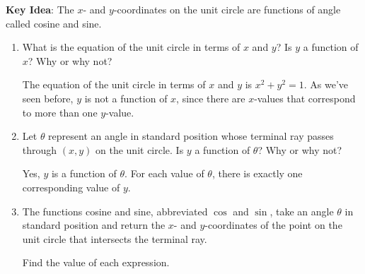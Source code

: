 \documentclass[main]{subfiles}
\begin{document}
\pspace{\newpage}

\textbf{Key Idea}: The $x$- and $y$-coordinates on the unit circle are functions of angle called cosine and sine.

\begin{enumerate}[resume]
    \item 
    \begin{problem}
    What is the equation of the unit circle in terms of $x$ and $y$? Is $y$ a function of $x$? Why or why not?
    \end{problem}
    \pspace{\vfill}

    \begin{solution}
        The equation of the unit circle in terms of $x$ and $y$ is $x^2+y^2=1$. As we've seen before, $y$ is not a function of $x$, since there are $x$-values that correspond to more than one $y$-value.
    \end{solution}

    \item
    \begin{problem}
    Let $\theta$ represent an angle in standard position whose terminal ray passes through $(x,y)$ on the unit circle. Is $y$ a function of $\theta$? Why or why not?
    \end{problem}
    \pspace{\vfill}

    \begin{solution}
        Yes, $y$ is a function of $\theta$. For each value of $\theta$, there is exactly one corresponding value of $y$.
    \end{solution}

\item The functions cosine and sine, abbreviated $\cos$ and $\sin$, take an angle $\theta$ in standard position and return the $x$- and $y$-coordinates of the point on the unit circle that intersects the terminal ray.

Find the value of each expression.


\end{enumerate}
\end{document}
